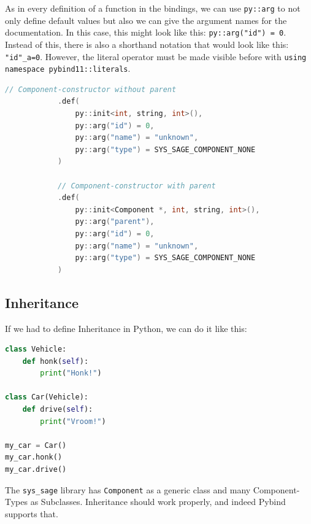 As in every definition of a function in the bindings, we can use \verb|py::arg| to not only define default values but also we can give the argument names for the documentation. In this case, this might look like this: \verb|py::arg("id") = 0|. Instead of this, there is also a shorthand notation that would look like this: \verb|"id"_a=0|. However, the literal operator must be made visible before with \verb|using namespace pybind11::literals|. \cite[see Advanced Topics/Functions]{pybind11-docu}
\begin{lstlisting}[language=C++, xleftmargin=4em, frame = single]
            // Component-constructor without parent
            .def(
                py::init<int, string, int>(),
                py::arg("id") = 0,
                py::arg("name") = "unknown",
                py::arg("type") = SYS_SAGE_COMPONENT_NONE
            )
            
            // Component-constructor with parent
            .def(
                py::init<Component *, int, string, int>(),
                py::arg("parent"),
                py::arg("id") = 0,
                py::arg("name") = "unknown",
                py::arg("type") = SYS_SAGE_COMPONENT_NONE
            )
\end{lstlisting}
\subsection{Inheritance}

If we had to define Inheritance in Python, we can do it like this:
\newpage
\begin{lstlisting}[language=Python, xleftmargin=4em, frame = single]
class Vehicle:
    def honk(self):
        print("Honk!")

class Car(Vehicle):
    def drive(self):
        print("Vroom!")

my_car = Car()
my_car.honk()
my_car.drive()
\end{lstlisting}

The \verb|sys_sage| library has \verb|Component| as a generic class and many Component-Types as Subclasses. Inheritance should work properly, and indeed Pybind supports that.

